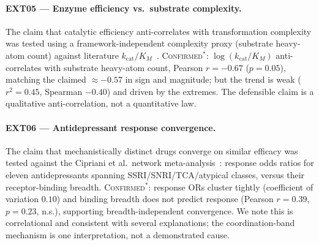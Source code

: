 \documentclass[11pt,twocolumn,a4paper]{article}
\begin{document}
\paragraph{EXT05 --- Enzyme efficiency vs.\ substrate complexity.}
The claim that catalytic efficiency anti-correlates with transformation
complexity was tested using a framework-independent complexity proxy (substrate
heavy-atom count) against literature $k_{\mathrm{cat}}/K_M$~\cite{fersht1999,
bionumbers2015}. \textsc{Confirmed$^\ast$}: $\log(k_{\mathrm{cat}}/K_M)$
anti-correlates with substrate heavy-atom count, Pearson $r=-0.67$ ($p=0.05$),
matching the claimed $\approx-0.57$ in sign and magnitude; but the trend is weak
($r^2=0.45$, Spearman $-0.40$) and driven by the extremes. The defensible claim
is a qualitative anti-correlation, not a quantitative law.

\paragraph{EXT06 --- Antidepressant response convergence.}
The claim that mechanistically distinct drugs converge on similar efficacy was
tested against the Cipriani et al.\ network meta-analysis~\cite{cipriani2018}:
response odds ratios for eleven antidepressants spanning SSRI/SNRI/TCA/atypical
classes, versus their receptor-binding breadth. \textsc{Confirmed$^\ast$}:
response ORs cluster tightly (coefficient of variation $0.10$) and binding
breadth does not predict response (Pearson $r=0.39$, $p=0.23$, n.s.), supporting
breadth-independent convergence. We note this is correlational and consistent
with several explanations; the coordination-band mechanism is one interpretation,
not a demonstrated cause.
\end{document}
